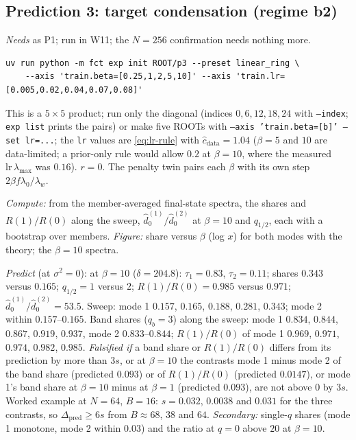 \documentclass[11pt,a4paper]{article}
\newcommand{\code}[1]{\texttt{#1}}
\begin{document}
\subsection{Prediction 3: target condensation (regime b2)}
\label{sec:P3}
\emph{Needs} as P1; run in W11; the $N = 256$ confirmation needs nothing more.
\begin{verbatim}
uv run python -m fct exp init ROOT/p3 --preset linear_ring \
    --axis 'train.beta=[0.25,1,2,5,10]' --axis 'train.lr=[0.005,0.02,0.04,0.07,0.08]'
\end{verbatim}
This is a $5\times5$ product; run only the diagonal (indices $0, 6, 12, 18, 24$ with \code{--index}; \code{exp list} prints the pairs) or make five ROOTs with \code{--axis 'train.beta=[b]' --set lr=...}; the \code{lr} values are \eqref{eq:lr-rule} with $\hat c_{\mathrm{data}} = 1.04$ ($\beta = 5$ and $10$ are data-limited; a prior-only rule would allow $0.2$ at $\beta = 10$, where the measured $\mathrm{lr}\,\lambda_{\max}$ was $0.16$). $r = 0$. The penalty twin pairs each $\beta$ with its own step $2\beta f\lambda_0/\lambda_w$.

\emph{Compute:} from the member-averaged final-state spectra, the shares and $R(1)/R(0)$ along the sweep, $\hat d_0^{(1)}/\hat d_0^{(2)}$ at $\beta = 10$ and $q_{1/2}$, each with a bootstrap over members. \emph{Figure:} share versus $\beta$ (log $x$) for both modes with the theory; the $\beta = 10$ spectra.

\emph{Predict} (at $\sigma^2 = 0$): at $\beta = 10$ ($\delta = 204.8$): $\tau_1 = 0.83$, $\tau_2 = 0.11$; shares $0.343$ versus $0.165$; $q_{1/2} = 1$ versus $2$; $R(1)/R(0) = 0.985$ versus $0.971$; $\hat d_0^{(1)}/\hat d_0^{(2)} = 53.5$. Sweep: mode 1 $0.157$, $0.165$, $0.188$, $0.281$, $0.343$; mode 2 within $0.157$--$0.165$. Band shares ($q_b = 3$) along the sweep: mode 1 $0.834$, $0.844$, $0.867$, $0.919$, $0.937$, mode 2 $0.833$--$0.844$; $R(1)/R(0)$ of mode 1 $0.969$, $0.971$, $0.974$, $0.982$, $0.985$. \emph{Falsified if} a band share or $R(1)/R(0)$ differs from its prediction by more than $3s$, or at $\beta = 10$ the contrasts mode 1 minus mode 2 of the band share (predicted $0.093$) or of $R(1)/R(0)$ (predicted $0.0147$), or mode 1's band share at $\beta = 10$ minus at $\beta = 1$ (predicted $0.093$), are not above $0$ by $3s$. Worked example at $N = 64$, $B = 16$: $s = 0.032$, $0.0038$ and $0.031$ for the three contrasts, so $\Delta_{\mathrm{pred}}\ge6s$ from $B\approx68$, $38$ and $64$. \emph{Secondary:} single-$q$ shares (mode 1 monotone, mode 2 within $0.03$) and the ratio at $q = 0$ above $20$ at $\beta = 10$.
\end{document}
